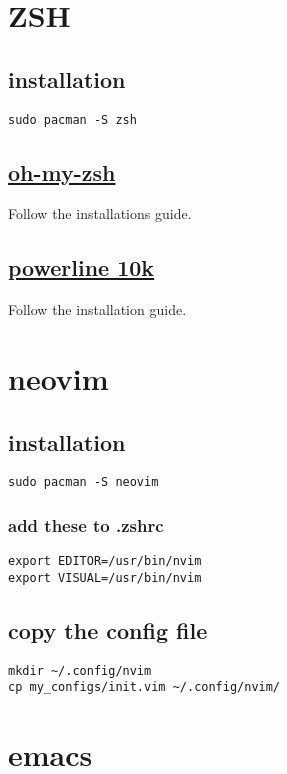 \documentclass[11pt]{article}
\begin{document}
\section{ZSH}
\label{sec:org520bb61}
\subsection{installation}
\label{sec:org1b17e24}
\begin{verbatim}
sudo pacman -S zsh
\end{verbatim}
\subsection{\href{https://github.com/ohmyzsh/ohmyzsh}{oh-my-zsh}}
\label{sec:org4aade17}
Follow the installations guide.\\
\subsection{\href{https://github.com/romkatv/powerlevel10k}{powerline 10k}}
\label{sec:org1a0b090}
Follow the installation guide.\\
\section{neovim}
\label{sec:orge348190}
\subsection{installation}
\label{sec:org14cac0f}
\begin{verbatim}
sudo pacman -S neovim
\end{verbatim}
\subsubsection{add these to .zshrc}
\label{sec:orga6af6f5}
\begin{verbatim}
export EDITOR=/usr/bin/nvim
export VISUAL=/usr/bin/nvim
\end{verbatim}
\subsection{copy the config file}
\label{sec:org3bd1cd3}
\begin{verbatim}
mkdir ~/.config/nvim
cp my_configs/init.vim ~/.config/nvim/
\end{verbatim}
\section{emacs}
\label{sec:orgd0ee558}
\end{document}
